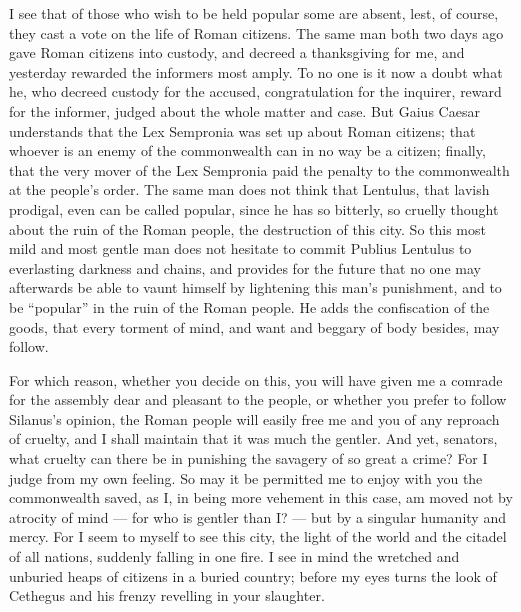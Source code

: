  I see that of those who wish to be held popular some are absent, lest, of course, they cast a vote on the life of Roman citizens. The same man both two days ago gave Roman citizens into custody, and decreed a thanksgiving for me, and yesterday rewarded the informers most amply. To no one is it now a doubt what he, who decreed custody for the accused, congratulation for the inquirer, reward for the informer, judged about the whole matter and case. But Gaius Caesar understands that the Lex Sempronia was set up about Roman citizens; that whoever is an enemy of the commonwealth can in no way be a citizen; finally, that the very mover of the Lex Sempronia paid the penalty to the commonwealth at the people's order. The same man does not think that Lentulus, that lavish prodigal, even can be called popular, since he has so bitterly, so cruelly thought about the ruin of the Roman people, the destruction of this city. So this most mild and most gentle man does not hesitate to commit Publius Lentulus to everlasting darkness and chains, and provides for the future that no one may afterwards be able to vaunt himself by lightening this man's punishment, and to be ``popular'' in the ruin of the Roman people. He adds the confiscation of the goods, that every torment of mind, and want and beggary of body besides, may follow.

 For which reason, whether you decide on this, you will have given me a comrade for the assembly dear and pleasant to the people, or whether you prefer to follow Silanus's opinion, the Roman people will easily free me and you of any reproach of cruelty, and I shall maintain that it was much the gentler. And yet, senators, what cruelty can there be in punishing the savagery of so great a crime? For I judge from my own feeling. So may it be permitted me to enjoy with you the commonwealth saved, as I, in being more vehement in this case, am moved not by atrocity of mind --- for who is gentler than I? --- but by a singular humanity and mercy. For I seem to myself to see this city, the light of the world and the citadel of all nations, suddenly falling in one fire. I see in mind the wretched and unburied heaps of citizens in a buried country; before my eyes turns the look of Cethegus and his frenzy revelling in your slaughter.

